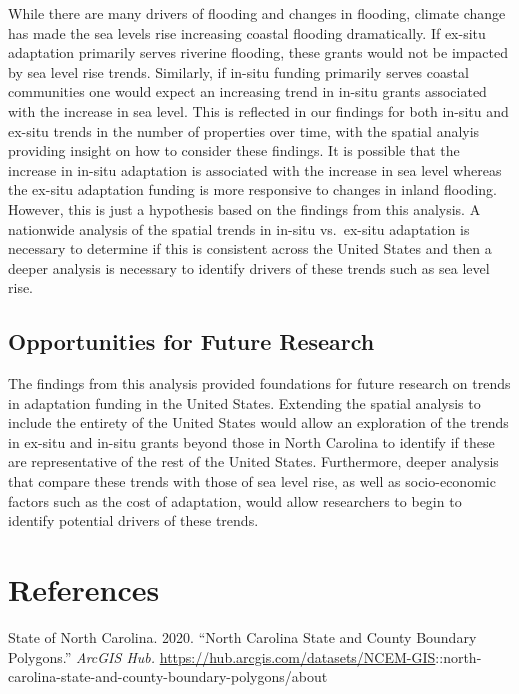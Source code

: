 \documentclass[
  12pt,
]{article}
\begin{document}
While there are many drivers of flooding and changes in flooding,
climate change has made the sea levels rise increasing coastal flooding
dramatically. If ex-situ adaptation primarily serves riverine flooding,
these grants would not be impacted by sea level rise trends. Similarly,
if in-situ funding primarily serves coastal communities one would expect
an increasing trend in in-situ grants associated with the increase in
sea level. This is reflected in our findings for both in-situ and
ex-situ trends in the number of properties over time, with the spatial
analyis providing insight on how to consider these findings. It is
possible that the increase in in-situ adaptation is associated with the
increase in sea level whereas the ex-situ adaptation funding is more
responsive to changes in inland flooding. However, this is just a
hypothesis based on the findings from this analysis. A nationwide
analysis of the spatial trends in in-situ vs.~ex-situ adaptation is
necessary to determine if this is consistent across the United States
and then a deeper analysis is necessary to identify drivers of these
trends such as sea level rise.

\hypertarget{opportunities-for-future-research}{%
\subsection{Opportunities for Future
Research}\label{opportunities-for-future-research}}

The findings from this analysis provided foundations for future research
on trends in adaptation funding in the United States. Extending the
spatial analysis to include the entirety of the United States would
allow an exploration of the trends in ex-situ and in-situ grants beyond
those in North Carolina to identify if these are representative of the
rest of the United States. Furthermore, deeper analysis that compare
these trends with those of sea level rise, as well as socio-economic
factors such as the cost of adaptation, would allow researchers to begin
to identify potential drivers of these trends.

\newpage

\hypertarget{references}{%
\section{References}\label{references}}

State of North Carolina. 2020. ``North Carolina State and County
Boundary Polygons.'' \emph{ArcGIS Hub.}
\url{https://hub.arcgis.com/datasets/NCEM-GIS}::north-carolina-state-and-county-boundary-polygons/about
\end{document}
